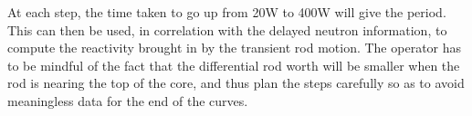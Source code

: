 At each step, the time taken to go up from 20W to 400W will give the period. This can then be used, in correlation with the delayed neutron information, to compute the reactivity brought in by the transient rod motion. The operator has to be mindful of the fact that the differential rod worth will be smaller when the rod is nearing the top of the core, and thus plan the steps carefully so as to avoid meaningless data for the end of the curves.
